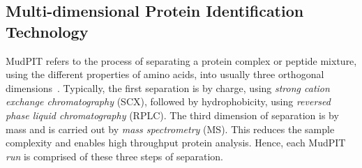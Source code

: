 \documentclass[11pt,a4paper]{article}
\begin{document}
\subsection{Multi-dimensional Protein Identification Technology} \label{subsec:MudPIT}
MudPIT refers to the process of separating a protein complex or peptide mixture, using the different properties of amino acids, into usually three orthogonal dimensions~\citep{Washburn2001}. Typically, the first separation is by charge, using \emph{strong cation exchange chromatography} (SCX), followed by hydrophobicity, using \emph{reversed phase liquid chromatography} (RPLC). The third dimension of separation is by mass and is carried out by \emph{mass spectrometry} (MS). This reduces the sample complexity and enables high throughput protein analysis. Hence, each  MudPIT \emph{run} is comprised of these three steps of separation.


\end{document}
